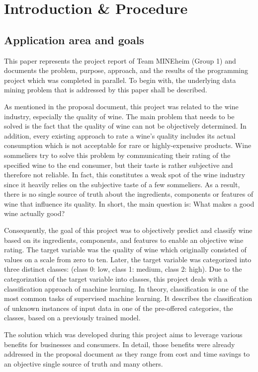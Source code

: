 \chapter{Introduction \& Procedure}
\section{Application area and goals}


This paper represents the project report of Team MINEheim (Group 1) and documents the problem, purpose, approach, and the results of the programming project which was completed in parallel. To begin with, the underlying data mining problem that is addressed by this paper shall be described.

As mentioned in the proposal document, this project was related to the wine industry, especially the quality of wine. The main problem that needs to be solved is the fact that the quality of wine can not be objectively determined. In addition, every existing approach to rate a wine's quality includes its actual consumption which is not acceptable for rare or highly-expensive products. Wine sommeliers try to solve this problem by communicating their rating of the specified wine to the end consumer, but their taste is rather subjective and therefore not reliable. In fact, this constitutes a weak spot of the wine industry since it heavily relies on the subjective taste of a few sommeliers. As a result, there is no single source of truth about the ingredients, components or features of wine that influence its quality. In short, the main question is: What makes a good wine actually good?

Consequently, the goal of this project was to objectively predict and classify wine based on its ingredients, components, and features to enable an objective wine rating. The target variable was the quality of wine which originally consisted of values on a scale from zero to ten. Later, the target variable was categorized into three distinct classes: (class 0: low, class 1: medium, class 2: high). Due to the categorization of the target variable into classes, this project deals with a classification approach of machine learning. In theory, classification is one of the most common tasks of supervised machine learning. It describes the classification of unknown instances of input data in one of the pre-offered categories, the classes, based on a previously trained model.\citep{Novakovic2010}

The solution which was developed during this project aims to leverage various benefits for businesses and consumers. In detail, those benefits were already addressed in the proposal document as they range from cost and time savings to an objective single source of truth and many others. 